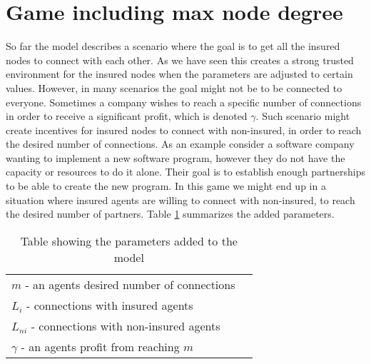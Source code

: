 
\section{Game including max node degree}
So far the model describes a scenario where the goal is to get all the insured nodes to connect with each other. As we have seen this creates a strong trusted environment for the insured nodes when the parameters are adjusted to certain values. However, in many scenarios the goal might not be to be connected to everyone. Sometimes a company wishes to reach a specific number of connections in order to receive a significant profit, which is denoted $\gamma$. Such scenario might create incentives for insured nodes to connect with non-insured, in order to reach the desired number of connections. As an example consider a software company wanting to implement a new software program, however they do not have the capacity or resources to do it alone. Their goal is to establish enough partnerships to be able to create the new program. In this game we might end up in a situation where insured agents are willing to connect with non-insured, to reach the desired number of partners. Table \ref{tbl:model3para} summarizes the added parameters. 

\begin{table}[h]
\centering
\begin{tabular}{lc}
 \hline
  $m$ - an agents desired number of connections\\
  $L_{i}$ - connections with insured agents \\
  $L_{ni}$ - connections with non-insured agents\\
  $\gamma$ - an agents profit from reaching $m$ \\
  \hline
\end{tabular}
\caption{Table showing the parameters added to the model \label{tbl:model3para}}
\end{table}


